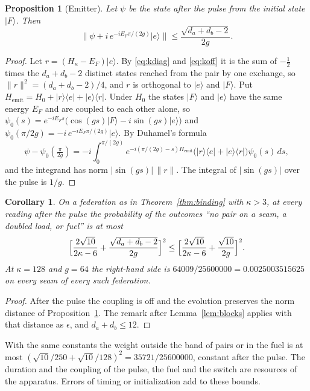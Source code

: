 \documentclass[11pt]{article}
\newtheorem{proposition}[theorem]{Proposition}
\newtheorem{corollary}[theorem]{Corollary}
\theoremstyle{definition}
\theoremstyle{remark}
\theoremstyle{plain}
\newcommand{\ket}[1]{\lvert #1\rangle}
\newcommand{\bra}[1]{\langle #1\rvert}
\begin{document}
\begin{proposition}[Emitter]
\label{prop:emitter}
Let $\psi$ be the state after the pulse from the initial state $\ket{F}$.
Then
\[
\bigl\lVert\psi+i\,e^{-iE_F\pi/(2g)}\ket{e}\bigr\rVert\le\frac{\sqrt{d_a+d_b-2}}{2g} .
\]
\end{proposition}

\begin{proof}
Let $r=(H_\kappa-E_F)\ket{e}$. By \eqref{eq:kdiag} and \eqref{eq:koff} it is
the sum of $-\tfrac12$ times the $d_a+d_b-2$ distinct states reached from
the pair by one exchange, so $\lVert r\rVert^{2}=(d_a+d_b-2)/4$, and $r$ is
orthogonal to $\ket{e}$ and $\ket{F}$. Put
$H_{\mathrm{emit}}=H_{0}+\ket{r}\bra{e}+\ket{e}\bra{r}$. Under $H_0$ the
states $\ket{F}$ and $\ket{e}$ have the same energy $E_F$ and are coupled
to each other alone, so
$\psi_0(s)=e^{-iE_Fs}\bigl(\cos(gs)\ket{F}-i\sin(gs)\ket{e}\bigr)$ and
$\psi_0(\pi/2g)=-i\,e^{-iE_F\pi/(2g)}\ket{e}$. By Duhamel's formula
\[
\psi-\psi_0(\tfrac{\pi}{2g})=-i\int_0^{\pi/(2g)}e^{-i(\pi/(2g)-s)H_{\mathrm{emit}}}
\bigl(\ket{r}\bra{e}+\ket{e}\bra{r}\bigr)\psi_0(s)\,ds ,
\]
and the integrand has norm $\lvert\sin(gs)\rvert\,\lVert r\rVert$. The
integral of $\lvert\sin(gs)\rvert$ over the pulse is $1/g$.
\end{proof}

\begin{corollary}
\label{cor:emitted}
On a federation as in Theorem~\ref{thm:binding} with $\kappa>3$, at every
reading after the pulse the probability of the outcomes ``no pair on a
seam, a doubled load, or fuel'' is at most
\[
\Bigl[\frac{2\sqrt{10}}{2\kappa-6}+\frac{\sqrt{d_a+d_b-2}}{2g}\Bigr]^{2}
\le\Bigl[\frac{2\sqrt{10}}{2\kappa-6}+\frac{\sqrt{10}}{2g}\Bigr]^{2}.
\]
At $\kappa=128$ and $g=64$ the right-hand side is
$64009/25600000=0.0025003515625$ on every seam of every such federation.
\end{corollary}

\begin{proof}
After the pulse the coupling is off and the evolution preserves the norm
distance of Proposition~\ref{prop:emitter}. The remark after
Lemma~\ref{lem:blocks} applies with that distance as $\epsilon$, and
$d_a+d_b\le12$.
\end{proof}

With the same constants the weight outside the band of pairs or in the fuel
is at most $(\sqrt{10}/250+\sqrt{10}/128)^{2}=35721/25600000$, constant
after the pulse. The duration and the coupling of the pulse, the fuel and
the switch are resources of the apparatus. Errors of timing or
initialization add to these bounds.
\end{document}

